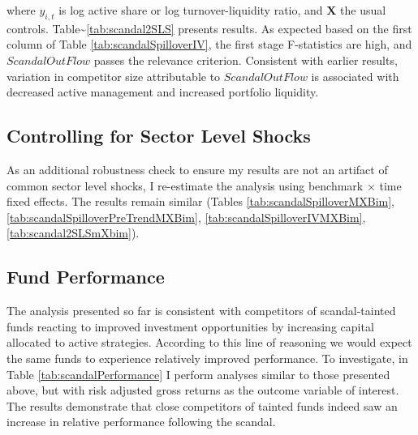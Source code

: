 \documentclass[openany]{book}
\theoremstyle{definition}
\theoremstyle{definition}
\theoremstyle{definition}
\theoremstyle{remark}
\begin{document}
where \(y_{i,t}\) is log active share or log turnover-liquidity ratio,
and \(\mathbf{X}\) the usual controls.
Table\textasciitilde{}\ref{tab:scandal2SLS} presents results. As
expected based on the first column of Table
\ref{tab:scandalSpilloverIV}, the first stage F-statistics are high, and
\(ScandalOutFlow\) passes the relevance criterion. Consistent with
earlier results, variation in competitor size attributable to
\(ScandalOutFlow\) is associated with decreased active management and
increased portfolio liquidity.

\subsection{Controlling for Sector Level Shocks}

As an additional robustness check to ensure my results are not an
artifact of common sector level shocks, I re-estimate the analysis using
benchmark \(\times\) time fixed effects. The results remain similar
(Tables \ref{tab:scandalSpilloverMXBim},
\ref{tab:scandalSpilloverPreTrendMXBim},
\ref{tab:scandalSpilloverIVMXBim}, \ref{tab:scandal2SLSmXbim}).

\subsection{Fund Performance}

The analysis presented so far is consistent with competitors of
scandal-tainted funds reacting to improved investment opportunities by
increasing capital allocated to active strategies. According to this
line of reasoning we would expect the same funds to experience
relatively improved performance. To investigate, in Table
\ref{tab:scandalPerformance} I perform analyses similar to those
presented above, but with risk adjusted gross returns as the outcome
variable of interest. The results demonstrate that close competitors of
tainted funds indeed saw an increase in relative performance following
the scandal.
\end{document}
